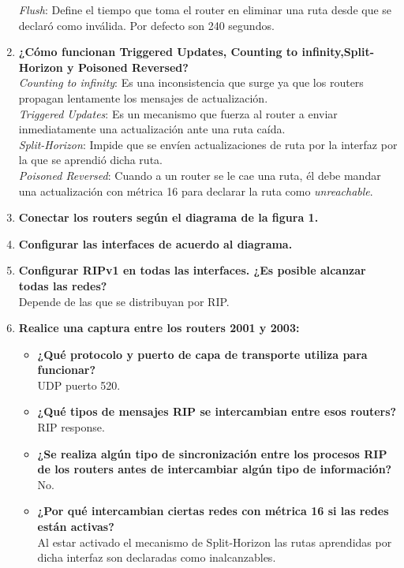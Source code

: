 \documentclass[letterpaper,12pt]{article}
\begin{document}
\begin{enumerate}
		\textit{Flush}: Define el tiempo que toma el router en eliminar una ruta desde que se declaró como inválida. Por defecto son 240 segundos.
		\item \textbf{¿Cómo funcionan Triggered Updates, Counting to infinity,Split-Horizon y Poisoned Reversed?}\\
		\textit{Counting to infinity}: Es una inconsistencia que surge ya que los routers propagan lentamente los mensajes de actualización.\\
		\textit{Triggered Updates}: Es un mecanismo que fuerza al router a enviar inmediatamente una actualización ante una ruta caída.\\
		\textit{Split-Horizon}: Impide que se envíen actualizaciones de ruta por la interfaz por la que se aprendió dicha ruta.\\
		\textit{Poisoned Reversed}: Cuando a un router se le cae una ruta, él debe mandar una actualización con métrica 16 para declarar la ruta como \textit{unreachable}.

		\item \textbf{Conectar los routers según el diagrama de la figura 1.}
		\item \textbf{Configurar las interfaces de acuerdo al diagrama.}
		\item \textbf{Configurar RIPv1 en todas las interfaces. ¿Es posible alcanzar todas las redes?} \\
		Depende de las que se distribuyan por RIP. 
		
		\item \textbf{Realice una captura entre los routers 2001 y 2003:}
		\begin{itemize}
			\item \textbf{¿Qué protocolo y puerto de capa de transporte utiliza para funcionar?} \\
			UDP puerto 520.
			\item \textbf{¿Qué tipos de mensajes RIP se intercambian entre esos routers?} \\
			RIP response.
			\item \textbf{¿Se realiza algún tipo de sincronización entre los procesos RIP de los routers antes de intercambiar algún tipo de información?} \\
			No.
			\item \textbf{¿Por qué intercambian ciertas redes con métrica 16 si las redes están activas?} \\
			Al estar activado el mecanismo de Split-Horizon las rutas aprendidas por dicha interfaz son declaradas como inalcanzables.
		\end{itemize}
		

\end{enumerate}
\end{document}
